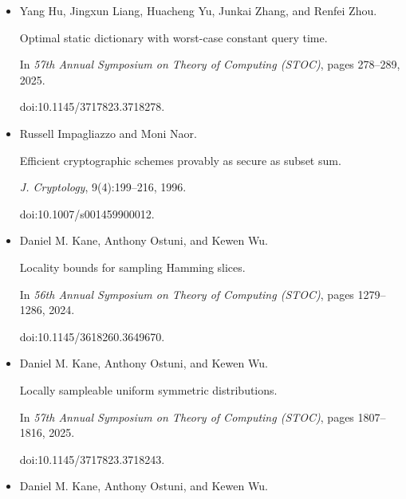 \documentclass[10pt,a4paper]{article}
\begin{document}
\begin{itemize}
\emph{Found. Trends Theor. Comput. Sci.}, 16(1-2):1–210, 2024.


doi:10.1561/0400000109.





\item[] 
[26]

Yang Hu, Jingxun Liang, Huacheng Yu, Junkai Zhang, and Renfei Zhou.


Optimal static dictionary with worst-case constant query time.


In \emph{57th Annual Symposium on Theory of Computing (STOC)}, pages
278–289, 2025.


doi:10.1145/3717823.3718278.





\item[] 
[27]

Russell Impagliazzo and Moni Naor.


Efficient cryptographic schemes provably as secure as subset sum.


\emph{J. Cryptology}, 9(4):199–216, 1996.


doi:10.1007/s001459900012.





\item[] 
[28]

Daniel M. Kane, Anthony Ostuni, and Kewen Wu.


Locality bounds for sampling Hamming slices.


In \emph{56th Annual Symposium on Theory of Computing (STOC)}, pages
1279–1286, 2024.


doi:10.1145/3618260.3649670.





\item[] 
[29]

Daniel M. Kane, Anthony Ostuni, and Kewen Wu.


Locally sampleable uniform symmetric distributions.


In \emph{57th Annual Symposium on Theory of Computing (STOC)}, pages
1807–1816, 2025.


doi:10.1145/3717823.3718243.





\item[] 
[30]

Daniel M. Kane, Anthony Ostuni, and Kewen Wu.



\end{itemize}
\end{document}
